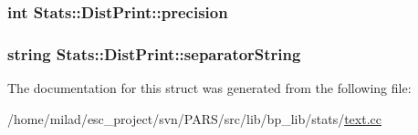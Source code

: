 \label{structStats_1_1DistPrint_a8effa42b5694542dac7f6fb7f1df4230}
\hypertarget{structStats_1_1DistPrint_ac1229f4102622ff8182e625410a7dfc5}{
\subsubsection[{precision}]{\setlength{\rightskip}{0pt plus 5cm}int {\bf Stats::DistPrint::precision}}}
\label{structStats_1_1DistPrint_ac1229f4102622ff8182e625410a7dfc5}
\hypertarget{structStats_1_1DistPrint_a9efef83fe3bbe8076c1b902e00204ca7}{
\subsubsection[{separatorString}]{\setlength{\rightskip}{0pt plus 5cm}string {\bf Stats::DistPrint::separatorString}}}
\label{structStats_1_1DistPrint_a9efef83fe3bbe8076c1b902e00204ca7}


The documentation for this struct was generated from the following file:\begin{DoxyCompactItemize}
\item 
/home/milad/esc\_\-project/svn/PARS/src/lib/bp\_\-lib/stats/\hyperlink{text_8cc}{text.cc}\end{DoxyCompactItemize}
